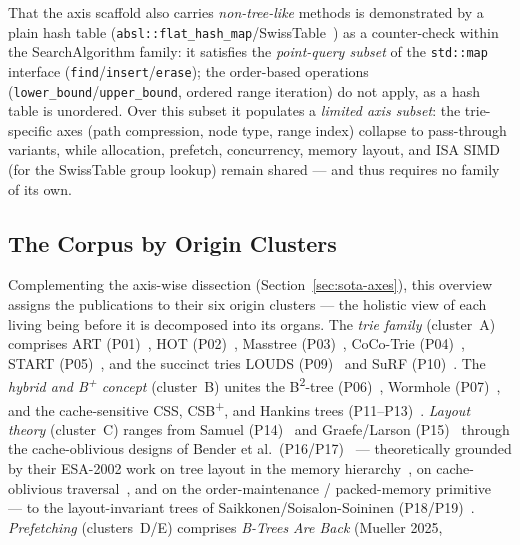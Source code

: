 That the axis scaffold also carries \emph{non-tree-like} methods is demonstrated by a plain hash
table (\texttt{absl::flat\_hash\_map}/SwissTable~\cite{abseil_swisstable}) as a counter-check within
the SearchAlgorithm family: it satisfies the \emph{point-query subset} of the \texttt{std::map}
interface (\texttt{find}/\texttt{insert}/\texttt{erase}); the order-based operations
(\texttt{lower\_bound}/\texttt{upper\_bound}, ordered range iteration) do not apply, as a hash table
is unordered. Over this subset it populates a \emph{limited axis subset}: the trie-specific axes
(path compression, node type, range index) collapse to pass-through variants, while allocation,
prefetch, concurrency, memory layout, and ISA SIMD (for the SwissTable group lookup) remain shared
--- and thus requires no family of its own.

\subsection{The Corpus by Origin Clusters}\label{ssec:sota-corpus}
Complementing the axis-wise dissection (Section~\ref{sec:sota-axes}), this overview assigns the
publications to their six origin clusters --- the holistic view of each living being before it is
decomposed into its organs. The \emph{trie family} (cluster~A) comprises ART
(P01)~\cite{leis2013art}, HOT (P02)~\cite{binna2018hot}, Masstree (P03)~\cite{mao2012masstree},
CoCo-Trie (P04)~\cite{boffa2024coco}, START (P05)~\cite{fent2020start}, and the succinct tries LOUDS
(P09)~\cite{jacobson1989louds} and SuRF (P10)~\cite{zhang2018surf}. The
\emph{hybrid and B\textsuperscript{+} concept} (cluster~B) unites the B\textsuperscript{2}-tree
(P06)~\cite{schmeisser2022b2tree}, Wormhole (P07)~\cite{wu2019wormhole}, and the cache-sensitive
CSS, CSB\textsuperscript{+}, and Hankins trees
(P11--P13)~\cite{rao1999css,rao2000csb,hankins2003nodesize}\@. \emph{Layout theory} (cluster~C) ranges
from Samuel (P14)~\cite{samuel2005procaware} and Graefe/Larson (P15)~\cite{graefe2001btree} through
the cache-oblivious designs of Bender et
al.\ (P16/P17)~\cite{bender2000cobtree,bender2005coboblivious} --- theoretically grounded by their
ESA-2002 work on tree layout in the memory hierarchy~\cite{bender2002treelayout}, on cache-oblivious
traversal~\cite{bender2002scanning}, and on the order-maintenance / packed-memory
primitive~\cite{bender2002orderlist} --- to the layout-invariant trees of
Saikkonen/Soisalon-Soininen (P18/P19)~\cite{saikkonen2008multilevel,saikkonen2016layout}.
\emph{Prefetching} (clusters~D/E) comprises \emph{B-Trees Are Back} (Mueller 2025,
